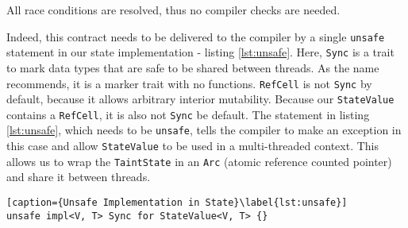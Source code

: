 All race conditions are resolved, thus no compiler checks are needed.

Indeed, this contract needs to be delivered to the compiler by a single \texttt{unsafe} statement in
our state implementation - listing \ref{lst:unsafe}. Here, \texttt{Sync} is a trait to mark data
types that are safe to be shared between threads. As the name recommends, it is a marker trait with
no functions. \texttt{RefCell} is not \texttt{Sync} by default, because it allows arbitrary interior
mutability. Because our \texttt{StateValue} contains a \texttt{RefCell}, it is also not
\texttt{Sync} be default. The statement in listing \ref{lst:unsafe}, which needs to be \texttt{unsafe}, tells
the compiler to make an exception in this case and allow \texttt{StateValue} to be used in a multi-threaded context. This allows us to wrap the \texttt{TaintState} in an \texttt{Arc} (atomic
reference counted pointer) and share it between threads.

\begin{lstlisting}[caption={Unsafe Implementation in State}\label{lst:unsafe}]
unsafe impl<V, T> Sync for StateValue<V, T> {}
\end{lstlisting}

